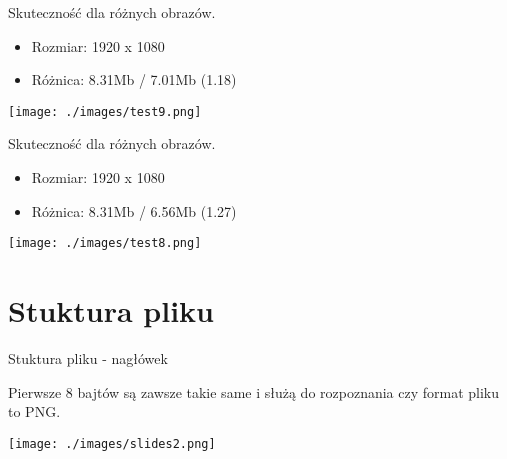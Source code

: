 \documentclass[presentation]{beamer}
\begin{document}
\begin{frame}[label={sec:org8b1b306}]{Skuteczność dla różnych obrazów.}
\begin{itemize}
\item Rozmiar: 1920 x 1080
\item Różnica: 8.31Mb / 7.01Mb (1.18)
\end{itemize}
\begin{center}
\texttt{[image: ./images/test9.png]}
\end{center}
\end{frame}

\begin{frame}[label={sec:orgea5d488}]{Skuteczność dla różnych obrazów.}
\begin{itemize}
\item Rozmiar: 1920 x 1080
\item Różnica: 8.31Mb / 6.56Mb (1.27)
\end{itemize}
\begin{center}
\texttt{[image: ./images/test8.png]}
\end{center}
\end{frame}


\section{Stuktura pliku}
\label{sec:orgd4136b8}
\begin{frame}[label={sec:org72a37d1}]{Stuktura pliku - nagłówek}
\begin{block}{Pierwsze 8 bajtów są zawsze takie same i służą do rozpoznania czy format pliku to PNG.}
\vspace{3cm}

\begin{center}
\texttt{[image: ./images/slides2.png]}
\end{center}
\end{block}
\end{frame}
\end{document}
